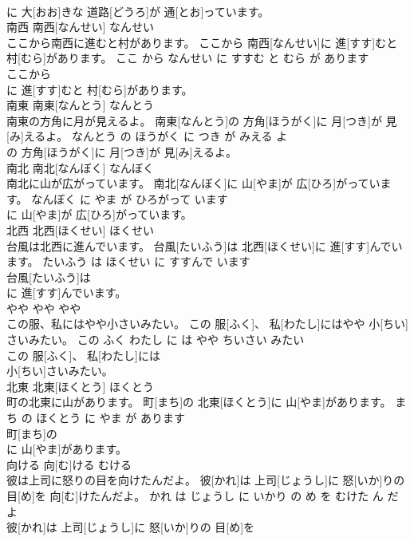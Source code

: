 \documentclass[8pt]{extreport}
\begin{document}
\begin{CJK}{UTF8}{min}
\\	に 大[おお]きな 道路[どうろ]が 通[とお]っています。			
\\	南西	南西[なんせい]	なんせい	
\\	ここから南西に進むと村があります。	ここから 南西[なんせい]に 進[すす]むと 村[むら]があります。	ここ から なんせい に すすむ と むら が あります	
\\	ここから
\\	に 進[すす]むと 村[むら]があります。			
\\	南東	南東[なんとう]	なんとう	
\\	南東の方角に月が見えるよ。	南東[なんとう]の 方角[ほうがく]に 月[つき]が 見[み]えるよ。	なんとう の ほうがく に つき が みえる よ	
\\	の 方角[ほうがく]に 月[つき]が 見[み]えるよ。			
\\	南北	南北[なんぼく]	なんぼく	
\\	南北に山が広がっています。	南北[なんぼく]に 山[やま]が 広[ひろ]がっています。	なんぼく に やま が ひろがって います	
\\	に 山[やま]が 広[ひろ]がっています。			
\\	北西	北西[ほくせい]	ほくせい	
\\	台風は北西に進んでいます。	台風[たいふう]は 北西[ほくせい]に 進[すす]んでいます。	たいふう は ほくせい に すすんで います	
\\	台風[たいふう]は
\\	に 進[すす]んでいます。			
\\	やや	やや	やや	
\\	この服、私にはやや小さいみたい。	この 服[ふく]、 私[わたし]にはやや 小[ちい]さいみたい。	この ふく わたし に は やや ちいさい みたい	
\\	この 服[ふく]、 私[わたし]には
\\	小[ちい]さいみたい。			
\\	北東	北東[ほくとう]	ほくとう	
\\	町の北東に山があります。	町[まち]の 北東[ほくとう]に 山[やま]があります。	まち の ほくとう に やま が あります	
\\	町[まち]の
\\	に 山[やま]があります。			
\\	向ける	向[む]ける	むける	
\\	彼は上司に怒りの目を向けたんだよ。	彼[かれ]は 上司[じょうし]に 怒[いか]りの 目[め]を 向[む]けたんだよ。	かれ は じょうし に いかり の め を むけた ん だ よ	
\\	彼[かれ]は 上司[じょうし]に 怒[いか]りの 目[め]を

\end{CJK}
\end{document}
